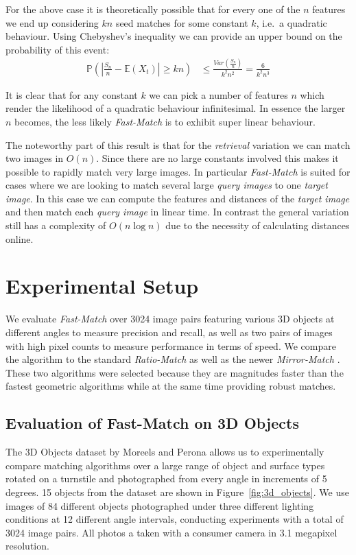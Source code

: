 \documentclass[runningheads]{llncs}
\begin{document}
For the above case it is theoretically possible that for every one of the $n$ features we end up considering $kn$ seed matches for some constant $k$, i.e.\ a quadratic behaviour. Using Chebyshev's inequality we can provide an upper bound on the probability of this event:
\begin{align}
    \label{bound}
    \mathbb{P}\left(\left| \frac{S_n}{n} - \mathbb{E}(X_t) \right| \ge kn\right) &\le \frac{Var\left(\frac{S_n}{n}\right)}{k^2n^2} = \frac{6}{k^2n^3}
\end{align}

It is clear that for any constant $k$ we can pick a number of features $n$ which render the likelihood of a quadratic behaviour infinitesimal. In essence the larger $n$ becomes, the less likely \emph{Fast-Match} is to exhibit super linear behaviour.

The noteworthy part of this result is that for the \emph{retrieval} variation we can match two images in $O(n)$. Since there are no large constants involved this makes it possible to rapidly match very large images. In particular \emph{Fast-Match} is suited for cases where we are looking to match several large \emph{query images} to one \emph{target image}. In this case we can compute the features and distances of the \emph{target image} and then match each \emph{query image} in linear time. In contrast the general variation still has a complexity of $O(n \log n)$ due to the necessity of calculating distances online.

\section{Experimental Setup}
\label{experiments}
%
We evaluate \emph{Fast-Match} over 3024 image pairs featuring various 3D objects at different angles to measure precision and recall, as well as two pairs of images with high pixel counts to measure performance in terms of speed. We compare the algorithm to the standard \emph{Ratio-Match} \cite{lowe2004sift} as well as the newer \emph{Mirror-Match} \cite{arnfred2013mirror}. These two algorithms were selected because they are magnitudes faster than the fastest geometric algorithms while at the same time providing robust matches.

\subsection{Evaluation of Fast-Match on 3D Objects}
\label{3dobjects}
%
The 3D Objects dataset by Moreels and Perona \cite{moreels2007evaluation} allows us to experimentally compare matching algorithms over a large range of object and surface types rotated on a turnstile and photographed from every angle in increments of 5 degrees. 15 objects from the dataset are shown in Figure~\ref{fig:3d_objects}.  We use images of 84 different objects photographed under three different lighting conditions at 12 different angle intervals, conducting experiments with a total of 3024 image pairs. All photos a taken with a consumer camera in 3.1 megapixel resolution.
\end{document}
